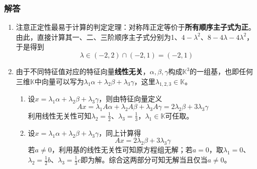 \documentclass[a4paper,UTF8,fontset=windows,AutoFakeBold]{ctexart}
\begin{document}
\subsubsection{解答}
\begin{enumerate}
    \item
    注意正定性最易于计算的判定定理：对称阵正定等价于\textbf{所有顺序主子式为正}。由此，直接计算其一、二、三阶顺序主子式分别为1、$4-\lambda^2$、$8-4\lambda-4\lambda^2$，于是得到
    $$\lambda\in(-2,2)\cap(-2,1)=(-2,1)$$

    \item
    由于不同特征值对应的特征向量\textbf{线性无关}，$\alpha,\beta,\gamma$构成$\mathbb{K}^3$的一组基，也即任何三维$\mathbb{K}$中向量可以写为$\lambda_1\alpha+\lambda_2\beta+\lambda_3\gamma$，这里$\lambda_{1,2,3}\in\mathbb{K}$。
    \begin{enumerate}
        \item 设$x=\lambda_1\alpha+\lambda_2\beta+\lambda_3\gamma$，则由特征向量定义
        $$Ax=\lambda_1A\alpha+\lambda_2A\beta+\lambda_3A\gamma=2\lambda_2\beta+3\lambda_3\gamma$$
        利用线性无关性可知$\lambda_2=\frac{1}{2}$、$\lambda_3=\frac{1}{3}$，$\lambda_1\in\mathbb{K}$可任取。

        \item 设$x=\lambda_1\alpha+\lambda_2\beta+\lambda_3\gamma$，同上计算得
        $$Ax=2\lambda_2\beta+3\lambda_3\gamma$$
        若$a\ne0$，利用基的线性无关性可知原方程组无解；若$a=0$，取$\lambda_1=0$、$\lambda_2=\frac{1}{2}b$、$\lambda_3=\frac{1}{3}c$即为解。综合这两部分可知无解当且仅当$a\ne0$。
    \end{enumerate}


\end{enumerate}
\end{document}

